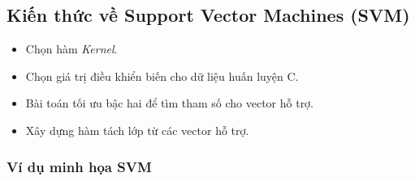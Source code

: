 \subsection{Kiến thức về Support Vector Machines (SVM)}
\begin{itemize}
    \item Chọn hàm \textit{Kernel}.
	\item Chọn giá trị điều khiển biến cho dữ liệu huấn luyện C.
	\item Bài toán tối ưu bậc hai để tìm tham số cho vector hỗ trợ.
	\item Xây dựng hàm tách lớp từ các vector hỗ trợ.
\end{itemize}

\subsubsection{Ví dụ minh họa SVM}
